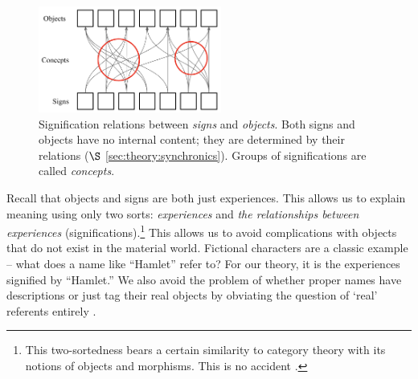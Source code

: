
\begin{figure}
    \centering
    \includegraphics[width=6cm]{NeurIPS/imgs/sign-concept-object.png}
    \caption{Signification relations between \textit{signs} and \textit{objects}. Both signs and objects  have no internal content; they are determined by their relations ($\S$ \ref{sec:theory:synchronics}). Groups of significations are called \textit{concepts}.}
    \label{fig:enter-label}
\end{figure}

Recall that objects and signs are both just experiences. This allows us to explain meaning using only two sorts: \textit{experiences} and \textit{the relationships between experiences} (significations).\footnote{This two-sortedness bears a certain similarity to category theory with its notions of objects and morphisms. This is no accident \citep{Tsuchiya:CategoryTheoryNeuroscience}.
}
This allows us to avoid complications with objects that do not exist in the material world.
Fictional characters are a classic example -- what does a name like ``Hamlet'' refer to? For our theory, it is the experiences signified by ``Hamlet.''
We also avoid the problem of whether proper names have descriptions or just tag their real objects by obviating the question of `real' referents entirely \citep{Kripke:NamingNecessity}.

